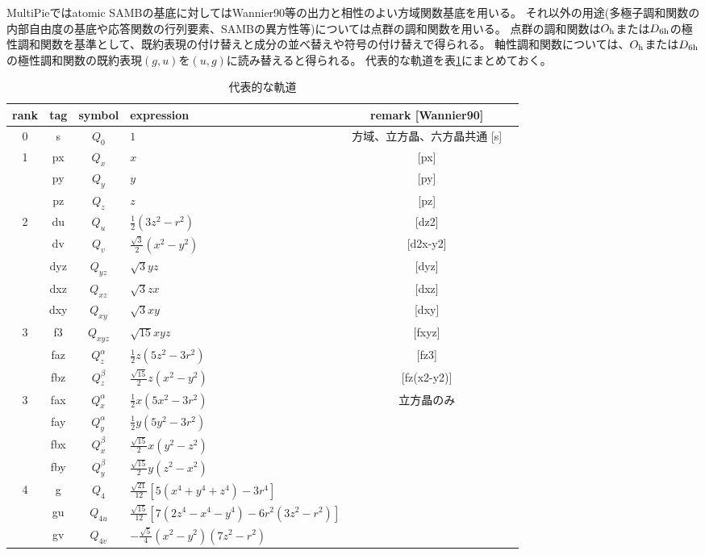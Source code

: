 \documentclass[11pt]{easymemo}
\begin{document}
MultiPieではatomic SAMBの基底に対してはWannier90等の出力と相性のよい方域関数基底を用いる。
それ以外の用途(多極子調和関数の内部自由度の基底や応答関数の行列要素、SAMBの異方性等)については点群の調和関数を用いる。
点群の調和関数は$O_{\rm h}$または$D_{\rm 6h}$の極性調和関数を基準として、既約表現の付け替えと成分の並べ替えや符号の付け替えで得られる。
軸性調和関数については、$O_{\rm h}$または$D_{\rm 6h}$の極性調和関数の既約表現$(g,u)$を$(u,g)$に読み替えると得られる。
代表的な軌道を表\ref{tbl:orb}にまとめておく。

\begin{table}[ht!]
\small
\begin{center}
\caption{代表的な軌道}
\label{tbl:orb}
\renewcommand{\arraystretch}{1.2}
\begin{tabular}{ccclcc} \hline\hline
rank & tag & symbol & expression & remark [Wannier90] \\ \hline
0 & s & $Q_0$ & $1$ & 方域、立方晶、六方晶共通 [s] \\
1 & px & $Q_x$ & $x$ & [px] \\
& py & $Q_y$ & $y$ & [py] \\
& pz & $Q_z$ & $z$ & [pz] \\
2 & du & $Q_u$ & $\frac{1}{2}(3z^2-r^2)$ & [dz2] \\
& dv & $Q_v$ & $\frac{\sqrt{3}}{2}(x^2-y^2)$ & [d2x-y2] \\
& dyz & $Q_{yz}$ & $\sqrt{3}yz$ & [dyz] \\
& dxz & $Q_{xz}$ & $\sqrt{3}zx$ & [dxz] \\
& dxy & $Q_{xy}$ & $\sqrt{3}xy$ & [dxy] \\
3 & f3 & $Q_{xyz}$ & $\sqrt{15}xyz$ & [fxyz] \\
& faz & $Q_z^\alpha$ & $\frac{1}{2}z(5z^2-3r^2)$ & [fz3] \\
& fbz & $Q_z^\beta$ & $\frac{\sqrt{15}}{2}z(x^2-y^2)$ & [fz(x2-y2)] \\ \hline
3 & fax & $Q_x^\alpha$ & $\frac{1}{2}x(5x^2-3r^2)$ & 立方晶のみ \\
& fay & $Q_y^\alpha$ & $\frac{1}{2}y(5y^2-3r^2)$ & \\
& fbx & $Q_x^\beta$ & $\frac{\sqrt{15}}{2}x(y^2-z^2)$ & \\
& fby & $Q_y^\beta$ & $\frac{\sqrt{15}}{2}y(z^2-x^2)$ & \\
4 & g & $Q_4$ & $\frac{\sqrt{21}}{12}[5(x^4+y^4+z^4)-3r^4]$ & \\
& gu & $Q_{4u}$ & $\frac{\sqrt{15}}{12}[7(2z^4-x^4-y^4)-6r^2(3z^2-r^2)]$ & \\
& gv & $Q_{4v}$ & $-\frac{\sqrt{5}}{4}(x^2-y^2)(7z^2-r^2)$ & \\

\end{tabular}
\end{center}
\end{table}
\end{document}
